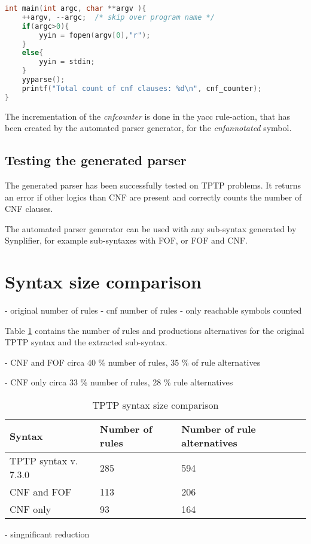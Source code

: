 \begin{lstlisting}[language=c, basicstyle=\scriptsize	,caption= \ac{CNF} parser main-function,label= lst:ValidationParserMainFunction]
 int main(int argc, char **argv ){
    ++argv, --argc;  /* skip over program name */
    if(argc>0){
        yyin = fopen(argv[0],"r");
    }
    else{
        yyin = stdin;
    }
    yyparse();
    printf("Total count of cnf clauses: %d\n", cnf_counter);
}
\end{lstlisting}
The incrementation of the \textit{cnf\textunderscore counter} is done in the yacc rule-action, that has been created  by the automated parser generator, for the \textit{cnf\textunderscore annotated} symbol.

\subsection{Testing the generated parser}\label{sec:ValidationAutomatedParserGeneration}
The generated parser has been successfully tested on \ac{TPTP} problems.
It returns an error if other logics than \ac{CNF} are present and correctly counts the number of \ac{CNF} clauses.

The automated parser generator can be used with any sub-syntax generated by \ac{Synplifier}, for example sub-syntaxes with \ac{FOF}, or \ac{FOF} and \ac{CNF}.

\section{Syntax size comparison}\label{sec:ValidationSyntaxSizeComparison}
- original number of rules
- cnf number of rules
- only reachable symbols counted

Table \ref{tbl:ConceptTPTPProductionSymbols} contains the number of rules and productions alternatives for the original \ac{TPTP} syntax and the extracted sub-syntax.

- \ac{CNF} and \ac{FOF} circa 40 \% number of rules, 35 \% of rule alternatives

- \ac{CNF} only circa 33 \% number of rules, 28 \% rule alternatives

\begin{table}[H]
\centering
\renewcommand{\arraystretch}{1.5}
\caption{\ac{TPTP} syntax size comparison}
\begin{tabular}{lll}
\textbf{Syntax} & \textbf{Number of rules} & \textbf{Number of rule alternatives}\\\hline
\ac{TPTP} syntax v. 7.3.0 & 285 & 594\\
\ac{CNF} and \ac{FOF} & 113 & 206\\
\ac{CNF} only & 93 & 164
\end{tabular}
\label{tbl:ConceptTPTPProductionSymbols}
\end{table}

- singnificant reduction

